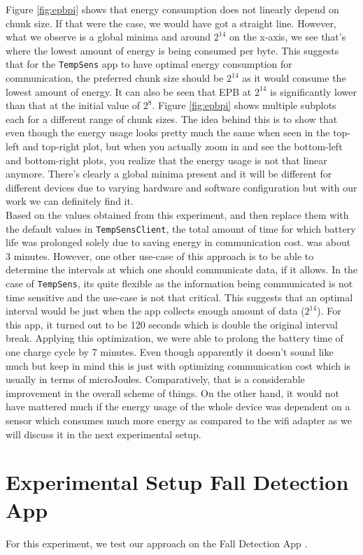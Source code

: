 Figure \ref{fig:epbpi} shows that energy consumption does not linearly depend on chunk size. If that were the case, 
we would have got a straight line. However, what we observe is a global minima and around \texttt{$2^{14}$} on 
the x-axis, we see that's where the lowest amount of energy is being consumed per byte. This suggests that 
for the \texttt{TempSens} app to have optimal energy consumption for communication, the preferred chunk size 
should be \texttt{$2^{14}$} as it would consume the lowest amount of energy. It can also be seen that EPB at \texttt{$2^{14}$} 
is significantly lower than that at the initial value of \texttt{$2^{8}$}. Figure \ref{fig:epbpi} shows multiple 
subplots each for a different range of chunk sizes. The idea behind this is to show that even though the energy 
usage looks pretty much the same when seen in the top-left and top-right plot, but when you actually zoom in 
and see the bottom-left and bottom-right plots, you realize that the energy usage is not that linear anymore. 
There's clearly a global minima present and it will be different for different devices due to varying 
hardware and software configuration but with our work we can definitely find it. \\
Based on the values obtained from this experiment, and then replace them with the default values in \texttt{TempSensClient}, 
the total amount of time for which battery life was prolonged solely due to saving energy in communication cost. 
was about 3 minutes. However, one other use-case of this approach is to be able to determine the intervals at 
which one should communicate data, if it allows. In the case of \texttt{TempSens}, its quite flexible as 
the information being communicated is not time sensitive and the use-case is not that critical. This suggests that 
an optimal interval would be just when the app collects enough amount of data (\texttt{$2^{14}$}). For this app, 
it turned out to be 120 seconds which is double the original interval break. Applying this optimization, we were 
able to prolong the battery time of one charge cycle by 7 minutes. Even though apparently it doesn't sound like much 
but keep in mind this is just with optimizing communication cost which is usually in terms of microJoules. 
Comparatively, that is a considerable improvement in the overall scheme of things. On the other hand, it would 
not have mattered much if the energy usage of the whole device was dependent on a sensor which consumes 
much more energy as compared to the wifi adapter as we will discuss it in the next experimental setup. \\

\section{Experimental Setup \textemdash Fall Detection App}
For this experiment, we test our approach on the Fall Detection App \cite{falld}.
